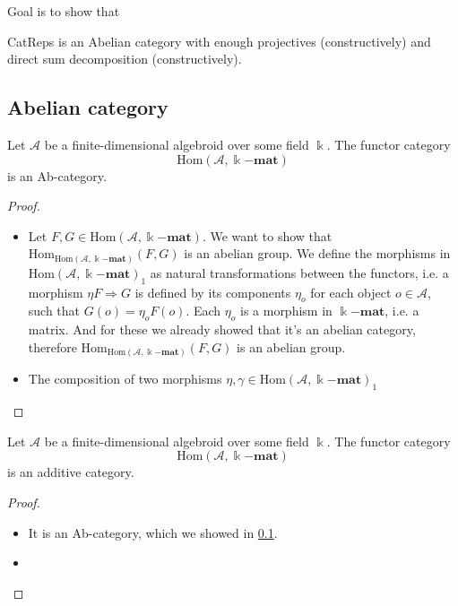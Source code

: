 Goal is to show that

CatReps is an Abelian category with enough projectives (constructively) and direct sum decomposition (constructively).

\subsection{Abelian category}

\begin{lemma}
Let $\mathcal{A}$ be a finite-dimensional algebroid over some field $\Bbbk$. The functor category
\[
\mathrm{Hom}(\mathcal{A},\Bbbk\mathbf{-mat})
\]
is an Ab-category.
\begin{proof}
\begin{itemize}
\renewcommand{\labelenumi}{(\theenumi)}
\item Let $F, G \in \mathrm{Hom}(\mathcal{A},\Bbbk\mathbf{-mat})$. We want to show that
$\mathrm{Hom}_{\mathrm{Hom}(\mathcal{A},\Bbbk\mathbf{-mat})}(F,G)$ is an abelian group.
We define the morphisms in $\mathrm{Hom}(\mathcal{A},\Bbbk\mathbf{-mat})_{1}$ as natural transformations
between the functors, i.e. a morphism $\eta F \Rightarrow G$ is defined by its components $\eta_{o}$ for each object $o \in \mathcal{A}$,
such that $G(o) = \eta_{o} F(o)$. Each $\eta_{o}$ is a morphism in $\Bbbk\mathbf{-mat}$, i.e. a matrix. And for these we already
showed that it's an abelian category, therefore $\mathrm{Hom}_{\mathrm{Hom}(\mathcal{A},\Bbbk\mathbf{-mat})}(F,G)$ is an abelian group.
\item The composition of two morphisms $\eta, \gamma \in \mathrm{Hom}(\mathcal{A},\Bbbk\mathbf{-mat})_{1}$ 
\end{itemize}
\end{proof}
\end{lemma}

\begin{lemma}
Let $\mathcal{A}$ be a finite-dimensional algebroid over some field $\Bbbk$. The functor category
\[
\mathrm{Hom}(\mathcal{A},\Bbbk\mathbf{-mat})
\]
is an additive category.
\begin{proof}
\begin{itemize}
\renewcommand{\labelenumi}{(\theenumi)}
\item It is an Ab-category, which we showed in \ref{}.
\item
\end{itemize}
\end{proof}
\end{lemma}

